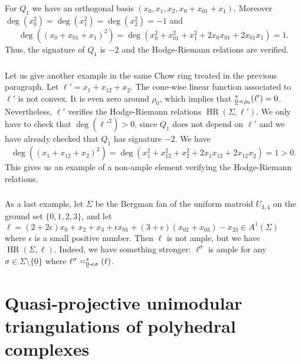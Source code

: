 \documentclass[11pt]{amsart}
\theoremstyle{definition}
\numberwithin{equation}{section}
\renewcommand{\~}{\widetilde}
\DeclareMathOperator{\HR}{HR} %
\let\i\relax
\newcommand{\i}{{\mathop{}\mathrm{i}}} %
\newcommand{\conezero}{{\underline0}} %
\newcommand{\subface}{\prec}
\newcommand{\ssubface}{\mathbin{\mathchoice
  {\subface\!\!\!\cdot}%
  {\subface\!\!\!\cdot}%
  {\subface\!\cdot}%
  {\subface\!\cdot}%
}} %
\begin{document}
For $Q_1$ we have an orthogonal basis $(x_0, x_1, x_2, x_0+x_{01}+x_1)$. Moreover $\deg(x_0^2)=\deg(x_1^2)=\deg(x_2^2)=-1$ and
\[ \deg((x_0+x_{01}+x_1)^2)=\deg(x_0^2+x_{01}^2+x_1^2+2x_0x_{01}+2x_{01}x_1)=1. \]
Thus, the signature of $Q_1$ is $-2$ and the Hodge-Riemann relations are verified.

\medskip


\subsubsection{} Let us give another example in the same Chow ring treated in the previous paragraph. Let $\ell'=x_1+x_{12}+x_2$. The cone-wise linear function associated to $\ell'$ is not convex. It is even zero around $\rho_0$, which implies that $\i^*_{\conezero\ssubface\rho_0}(\ell')=0$. Nevertheless, $\ell'$ verifies the Hodge-Riemann relations $\HR(\Sigma, \ell')$. We only have to check that $\deg(\ell'^2)>0$, since $Q_1$ does not depend on $\ell'$ and we have already checked that $Q_1$ has signature $-2$. We have
\[ \deg((x_1+x_{12}+x_2)^2)=\deg(x_1^2+x_{12}^2+x_2^2+2x_1x_{12}+2x_{12}x_2)=1>0. \]
This gives us an example of a non-ample element verifying the Hodge-Riemann relations.

\medskip


\subsubsection{} As a last example, let $\Sigma$ be the Bergman fan of the uniform matroid $U_{3,4}$ on the ground set $\{0,1,2,3\}$, and let $\ell=(2+2\epsilon)x_0+x_2+x_3+\epsilon x_{01}+(3+\epsilon)(x_{02}+x_{03})-x_{23}\in A^1(\Sigma)$ where $\epsilon$ is a small positive number. Then $\ell$ is not ample, but we have $\HR(\Sigma, \ell)$. Indeed, we have something stronger: $\ell^\sigma$ is ample for any $\sigma\in\Sigma\setminus\{\conezero\}$ where $\ell^\sigma = \i^*_{\conezero \subface \sigma}(\ell)$.






\section{Quasi-projective unimodular triangulations of polyhedral complexes}\label{sec:triangulation}
\end{document}
